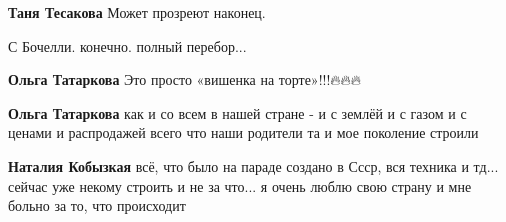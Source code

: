 \begin{itemize}
\begin{itemize}
 
\textbf{Таня Тесакова} Может прозреют наконец.
\end{itemize}

 
С Бочелли. конечно. полный перебор...

\begin{itemize}
 
\textbf{Ольга Татаркова} Это просто «вишенка на торте»!!!🔥🔥🔥

 
\textbf{Ольга Татаркова} как и со всем в нашей стране - и с землёй и с газом и
с ценами и распродажей всего что наши родители та и мое поколение строили

 
\textbf{Наталия Кобызкая} всё, что было на параде создано в Ссср, вся техника и
тд... сейчас уже некому строить и не за что... я очень люблю свою страну и мне
больно за то, что происходит
\end{itemize}

 


\end{itemize}
